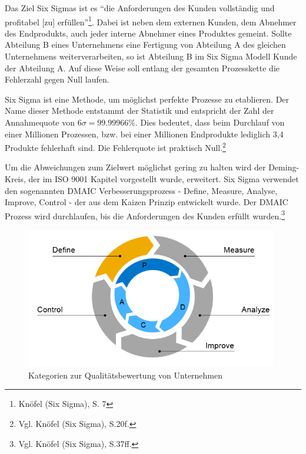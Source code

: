             Das Ziel Six Sigmas ist es \enquote{die Anforderungen des Kunden vollständig und profitabel [zu] erfüllen}\footnote{Knöfel (Six Sigma), S. 7}. Dabei ist neben dem externen Kunden, dem Abnehmer des Endprodukts, auch jeder interne Abnehmer eines Produktes gemeint. Sollte Abteilung B eines Unternehmens eine Fertigung von Abteilung A des gleichen Unternehmens weiterverarbeiten, so ist Abteilung B im Six Sigma Modell Kunde der Abteilung A. Auf diese Weise soll entlang der gesamten Prozesskette die Fehlerzahl gegen Null laufen.

            Six Sigma ist eine Methode, um möglichst perfekte Prozesse zu etablieren. Der Name dieser Methode entstammt der Statistik und entspricht der Zahl der Annahmequote von $6\sigma = 99.99966\%$. Dies bedeutet, dass beim Durchlauf von einer Millionen Prozessen, bzw. bei einer Millionen Endprodukte lediglich 3,4 Produkte fehlerhaft sind. Die Fehlerquote ist praktisch Null.\footnote{Vgl. Knöfel (Six Sigma), S.20f.}

            Um die Abweichungen zum Zielwert möglichst gering zu halten wird der Deming-Kreis, der im ISO 9001 Kapitel vorgestellt wurde, erweitert. Six Sigma verwendet den sogenannten DMAIC Verbesserungsprozess - Define, Measure, Analyse, Improve, Control - der aus dem Kaizen Prinzip entwickelt wurde. Der DMAIC Prozess wird durchlaufen, bis die Anforderungen des Kunden erfüllt wurden.\footnote{Vgl. Knöfel (Six Sigma), S.37ff.}

            \begin{figure}[!htbp]
                \begin{center}
                    \includegraphics[width=11cm]{Abbildungen/pdcavsdmaic}
                    \caption{Kategorien zur Qualitätsbewertung von Unternehmen}
                    \label{abb:pdcavsdmaic}
                \end{center}
            \end{figure}

